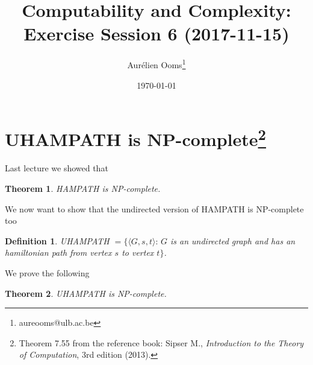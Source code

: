 \documentclass{article}
\title{Computability and Complexity:\\Exercise Session 6 (2017-11-15)}
\author{Aurélien Ooms\footnote{aureooms@ulb.ac.be}}
\date{\today}
\newcommand{\theoremname}{Theorem}
\newcommand{\definitionname}{Definition}
\newtheorem{theorem}{\theoremname}
\newtheorem{definition}{\definitionname}
\newcommand{\st}{\colon\,}
\begin{document}
\maketitle
\tableofcontents

\section{\texorpdfstring{UHAMPATH is NP-complete\footnote{%
Theorem 7.55 from the reference book: Sipser M.,
\emph{Introduction to the Theory of Computation}, 3rd edition
(2013).}}{UHAMPATH is NP-complete}}

Last lecture we showed that
\begin{theorem}
	HAMPATH is NP-complete.
\end{theorem}
We now want to show that the undirected version of HAMPATH is NP-complete too
\begin{definition}
	UHAMPATH \(= \{\langle G, s, t\rangle \st G\) is an undirected
	graph and has an hamiltonian path from vertex \(s\) to vertex
	\(t\}\).
\end{definition}
We prove the following
\begin{theorem}
	UHAMPATH is NP-complete.
\end{theorem}
\end{document}
